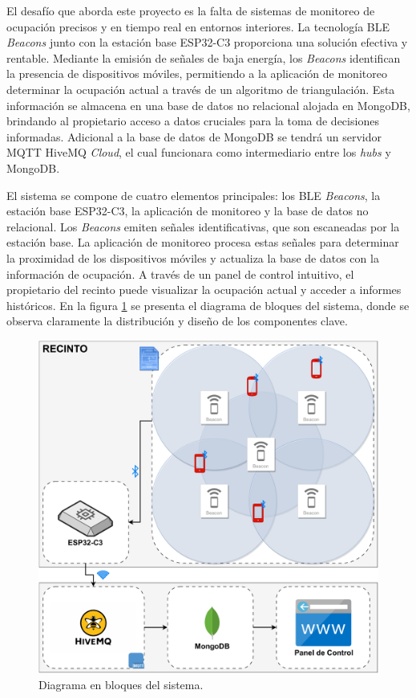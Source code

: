 \documentclass[
11pt, %
]{charter}
\begin{document}
El desafío que aborda este proyecto es la falta de sistemas de monitoreo de ocupación precisos y en tiempo real en entornos interiores. La tecnología BLE \textit{Beacons} junto con la estación base ESP32-C3 proporciona una solución efectiva y rentable. Mediante la emisión de señales de baja energía, los \textit{Beacons} identifican la presencia de dispositivos móviles, permitiendo a la aplicación de monitoreo determinar la ocupación actual a través de un algoritmo de triangulación. Esta información se almacena en una base de datos no relacional alojada en MongoDB, brindando al propietario acceso a datos cruciales para la toma de decisiones informadas. Adicional a la base de datos de MongoDB se tendrá un servidor MQTT HiveMQ \textit{Cloud}, el cual funcionara como intermediario entre los \textit{hubs} y MongoDB.

El sistema se compone de cuatro elementos principales: los BLE \textit{Beacons}, la estación base ESP32-C3, la aplicación de monitoreo y la base de datos no relacional. Los \textit{Beacons} emiten señales identificativas, que son escaneadas por la estación base. La aplicación de monitoreo procesa estas señales para determinar la proximidad de los dispositivos móviles y actualiza la base de datos con la información de ocupación. A través de un panel de control intuitivo, el propietario del recinto puede visualizar la ocupación actual y acceder a informes históricos. En la figura \ref{fig:diagBloques} se presenta el diagrama de bloques del sistema, donde se observa claramente la distribución y diseño de los componentes clave.

\begin{figure}[htpb]
\centering 
\includegraphics[width=.7\textwidth]{./Figuras/diagBloques.pdf}
\caption{Diagrama en bloques del sistema.}
\label{fig:diagBloques}
\end{figure}
\end{document}
